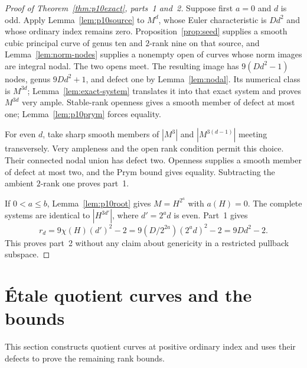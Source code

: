 \documentclass[11pt]{article}
\theoremstyle{definition}\newtheorem{definition}[theorem]{Definition}
\theoremstyle{remark}\newtheorem{remark}[theorem]{Remark}
\begin{document}
\begin{proof}[Proof of Theorem~\ref{thm:p10exact}, parts~1 and~2]
Suppose first $a=0$ and $d$ is odd. Apply Lemma~\ref{lem:p10source} to $M^d$, whose Euler characteristic is $Dd^2$ and whose ordinary index remains zero. Proposition~\ref{prop:seed} supplies a smooth cubic principal curve of genus ten and $2$-rank nine on that source, and Lemma~\ref{lem:norm-nodes} supplies a nonempty open of curves whose norm images are integral nodal. The two opens meet. The resulting image has $9(Dd^2-1)$ nodes, genus $9Dd^2+1$, and defect one by Lemma~\ref{lem:nodal}. Its numerical class is $M^{3d}$; Lemma~\ref{lem:exact-system} translates it into that exact system and proves $M^{3d}$ very ample. Stable-rank openness gives a smooth member of defect at most one; Lemma~\ref{lem:p10prym} forces equality.

For even $d$, take sharp smooth members of $|M^3|$ and $|M^{3(d-1)}|$ meeting transversely. Very ampleness and the open rank condition permit this choice. Their connected nodal union has defect two. Openness supplies a smooth member of defect at most two, and the Prym bound gives equality. Subtracting the ambient $2$-rank one proves part~1.

If $0<a\le b$, Lemma~\ref{lem:p10root} gives $M=H^{2^a}$ with $a(H)=0$. The complete systems are identical to $|H^{3d'}|$, where $d'=2^ad$ is even. Part~1 gives
\[
 r_d=9\chi(H)(d')^2-2=9(D/2^{2a})(2^ad)^2-2=9Dd^2-2.
\]
This proves part~2 without any claim about genericity in a restricted pullback subspace.
\end{proof}

\section{\'Etale quotient curves and the bounds}

This section constructs quotient curves at positive ordinary index and uses their defects to prove the remaining rank bounds.
\end{document}
